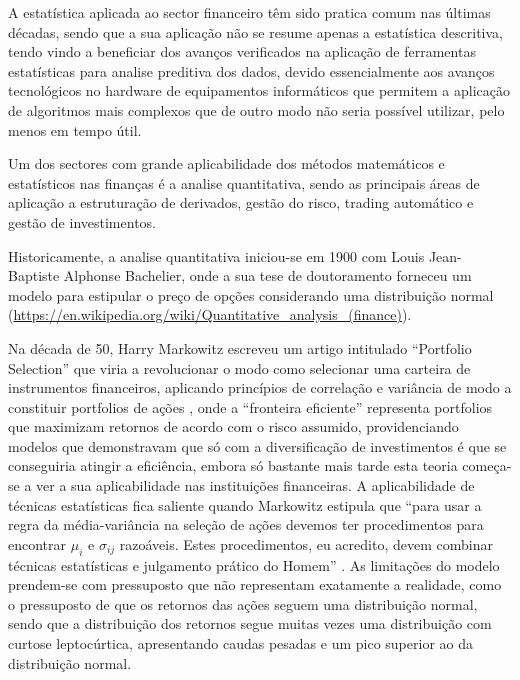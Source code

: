 \documentclass[
  12pt,
  brazil,
  a4paper,
  openany]{book}
\begin{document}
A estatística aplicada ao sector financeiro têm sido pratica comum nas últimas décadas, sendo que a sua aplicação não se resume apenas a estatística descritiva, tendo vindo a beneficiar dos avanços verificados na aplicação de ferramentas estatísticas para analise preditiva dos dados, devido essencialmente aos avanços tecnológicos no hardware de equipamentos informáticos que permitem a aplicação de algoritmos mais complexos que de outro modo não seria possível utilizar, pelo menos em tempo útil.

Um dos sectores com grande aplicabilidade dos métodos matemáticos e estatísticos nas finanças é a analise quantitativa, sendo as principais áreas de aplicação a estruturação de derivados, gestão do risco, trading automático e gestão de investimentos.

Historicamente, a analise quantitativa iniciou-se em 1900 com Louis Jean-Baptiste Alphonse Bachelier, onde a sua tese de doutoramento forneceu um modelo para estipular o preço de opções considerando uma distribuição normal (\url{https://en.wikipedia.org/wiki/Quantitative_analysis_(finance)}).

Na década de 50, Harry Markowitz escreveu um artigo intitulado ``Portfolio Selection'' que viria a revolucionar o modo como selecionar uma carteira de instrumentos financeiros, aplicando princípios de correlação e variância de modo a constituir portfolios de ações , onde a ``fronteira eficiente'' representa portfolios que maximizam retornos de acordo com o risco assumido, providenciando modelos que demonstravam que só com a diversificação de investimentos é que se conseguiria atingir a eficiência, embora só bastante mais tarde esta teoria começa-se a ver a sua aplicabilidade nas instituições financeiras. A aplicabilidade de técnicas estatísticas fica saliente quando Markowitz estipula que ``para usar a regra da média-variância na seleção de ações devemos ter procedimentos para encontrar \(\mu_i\) e \(\sigma_{ij}\) razoáveis. Estes procedimentos, eu acredito, devem combinar técnicas estatísticas e julgamento prático do Homem'' \autocite[pp.91]{Markowitz1952}. As limitações do modelo prendem-se com pressuposto que não representam exatamente a realidade, como o pressuposto de que os retornos das ações seguem uma distribuição normal, sendo que a distribuição dos retornos segue muitas vezes uma distribuição com curtose leptocúrtica, apresentando caudas pesadas e um pico superior ao da distribuição normal.
\end{document}

